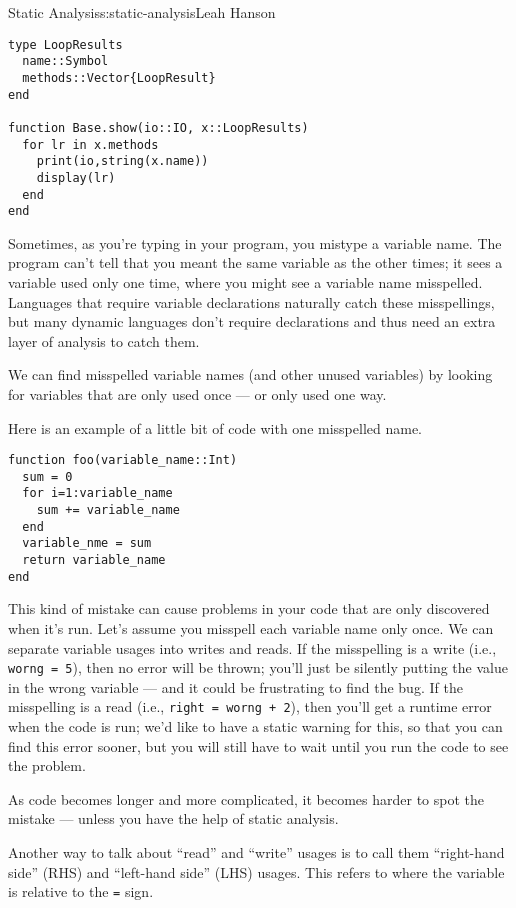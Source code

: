 \begin{aosachapter}{Static Analysis}{s:static-analysis}{Leah Hanson}
\begin{verbatim}
type LoopResults
  name::Symbol
  methods::Vector{LoopResult}
end

function Base.show(io::IO, x::LoopResults)
  for lr in x.methods
    print(io,string(x.name))
    display(lr)
  end
end
\end{verbatim}

\label{looking-for-unused-variables}

Sometimes, as you're typing in your program, you mistype a variable
name. The program can't tell that you meant the same variable as the
other times; it sees a variable used only one time, where you might see
a variable name misspelled. Languages that require variable declarations
naturally catch these misspellings, but many dynamic languages don't
require declarations and thus need an extra layer of analysis to catch
them.

We can find misspelled variable names (and other unused variables) by
looking for variables that are only used once --- or only used one way.

Here is an example of a little bit of code with one misspelled name.

\begin{verbatim}
function foo(variable_name::Int)
  sum = 0
  for i=1:variable_name
    sum += variable_name
  end
  variable_nme = sum
  return variable_name
end
\end{verbatim}

This kind of mistake can cause problems in your code that are only
discovered when it's run. Let's assume you misspell each variable name
only once. We can separate variable usages into writes and reads. If the
misspelling is a write (i.e., \texttt{worng = 5}), then no error will be
thrown; you'll just be silently putting the value in the wrong variable
--- and it could be frustrating to find the bug. If the misspelling is a
read (i.e., \texttt{right = worng + 2}), then you'll get a runtime error
when the code is run; we'd like to have a static warning for this, so
that you can find this error sooner, but you will still have to wait
until you run the code to see the problem.

As code becomes longer and more complicated, it becomes harder to spot
the mistake --- unless you have the help of static analysis.

\label{left-hand-side-and-right-hand-side}

Another way to talk about ``read'' and ``write'' usages is to call them
``right-hand side'' (RHS) and ``left-hand side'' (LHS) usages. This
refers to where the variable is relative to the \texttt{=} sign.


\end{aosachapter}
